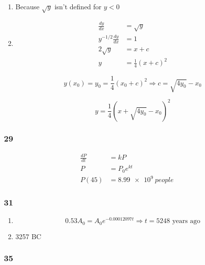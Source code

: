 \documentclass{article}
\begin{document}
\begin{enumerate}
  \item Because $\sqrt{y}$ isn't defined for $y < 0$

  \item

        \begin{align*}
          \frac{dy}{dx}            & = \sqrt{y}              \\
          y^{-1 / 2} \frac{dy}{dx} & = 1                     \\
          2 \sqrt{y}               & = x + c                 \\
          y                        & = \frac{1}{4} (x + c)^2
        \end{align*}

        \[y(x_0) = y_0 = \frac{1}{4} (x_0 + c)^2 \Rightarrow c = \sqrt{4 y_0} - x_0\]

        \[y = \frac{1}{4} (x + \sqrt{4 y_0} - x_0)^2\]
\end{enumerate}

\subsubsection{29}

\begin{align*}
  \frac{dP}{dt} & = kP                   \\
  P             & = P_0e^{kt}            \\
  P(45)         & = \qty{8.99e9}{people}
\end{align*}

\subsubsection{31}

\begin{enumerate}
  \item \[0.53 A_0 = A_0 e^{-0.00012097 t} \Rightarrow t = \num{5248} \text{ years ago}\]

  \item 3257 BC
\end{enumerate}

\subsubsection{35}
\end{document}
